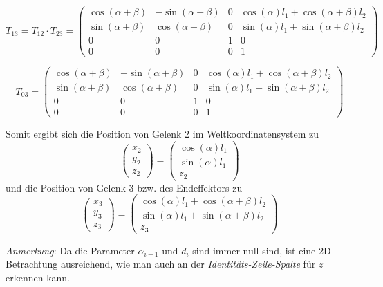 \begin{equation*}
	T_{13} = T_{12} \cdot T_{23} = \begin{pmatrix}
	\cos(\alpha + \beta) & -\sin(\alpha + \beta) & 0 & \cos(\alpha) l_1 + \cos(\alpha + \beta) l_2\\
	\sin(\alpha + \beta) & \cos(\alpha + \beta) & 0 & \sin(\alpha) l_1 + \sin(\alpha + \beta) l_2 \\
	0 & 0 & 1 & 0 \\
	0 & 0 & 0 & 1
	\end{pmatrix}
\end{equation*}

\begin{equation*}
	T_{03} = \begin{pmatrix}
	\cos(\alpha + \beta) & -\sin(\alpha + \beta) & 0 & \cos(\alpha) l_1 + \cos(\alpha + \beta) l_2\\
	\sin(\alpha + \beta) & \cos(\alpha + \beta) & 0 & \sin(\alpha) l_1 + \sin(\alpha + \beta) l_2 \\
	0 & 0 & 1 & 0 \\
	0 & 0 & 0 & 1
	\end{pmatrix}
\end{equation*}

Somit ergibt sich die Position von Gelenk 2 im Weltkoordinatensystem zu
\begin{equation*}
	\begin{pmatrix} x_2 \\ y_2 \\ z_2 \end{pmatrix} = \begin{pmatrix}
	\cos(\alpha) l_1\\ \sin(\alpha) l_1 \\ z_2 \end{pmatrix}
\end{equation*}
und die Position von Gelenk 3 bzw. des Endeffektors zu
\begin{equation*}
	\begin{pmatrix} x_3 \\ y_3 \\ z_3 \end{pmatrix} = 
	\begin{pmatrix}
	\cos(\alpha) l_1 + \cos(\alpha + \beta) l_2\\ \sin(\alpha) l_1 + \sin(\alpha + \beta) l_2 \\ z_3 
	\end{pmatrix}
\end{equation*}

\textit{Anmerkung}: Da die Parameter $\alpha_{i-1}$ und $d_i$ sind immer null sind, ist eine 2D Betrachtung ausreichend, wie man auch an der \emph{Identitäts-Zeile-Spalte} für $z$ erkennen kann.